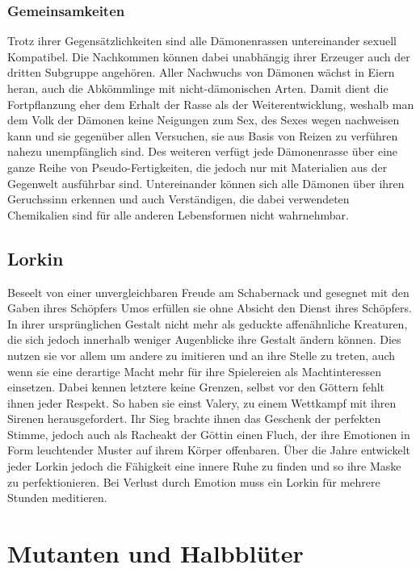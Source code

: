 \documentclass[a4paper,12pt,oneside]{book}
\begin{document}
\begin{description}
\subsection{Gemeinsamkeiten}
Trotz ihrer Gegensätzlichkeiten sind alle Dämonenrassen untereinander sexuell Kompatibel. Die Nachkommen können dabei unabhängig ihrer Erzeuger auch der dritten Subgruppe angehören. Aller Nachwuchs von Dämonen wächst in Eiern heran, auch die Abkömmlinge mit nicht-dämonischen Arten. Damit dient die Fortpflanzung eher dem Erhalt der Rasse als der Weiterentwicklung, weshalb man dem Volk der Dämonen keine Neigungen zum Sex, des Sexes wegen nachweisen kann und sie gegenüber allen Versuchen, sie aus Basis von Reizen zu verführen nahezu unempfänglich sind. Des weiteren verfügt jede Dämonenrasse über eine ganze Reihe von Pseudo-Fertigkeiten, die jedoch nur mit Materialien aus der Gegenwelt ausführbar sind. Untereinander können sich alle Dämonen über ihren Geruchssinn erkennen und auch Verständigen, die dabei verwendeten Chemikalien sind für alle anderen Lebensformen nicht wahrnehmbar. 
 \end{description}  

\section{Lorkin}
Beseelt von einer unvergleichbaren Freude am Schabernack und gesegnet mit den Gaben ihres Schöpfers Umos erfüllen sie ohne Absicht den Dienst ihres Schöpfers. In ihrer ursprünglichen Gestalt nicht mehr als geduckte affenähnliche Kreaturen, die sich jedoch innerhalb weniger Augenblicke ihre Gestalt ändern können. Dies nutzen sie vor allem um andere zu imitieren und an ihre Stelle zu treten, auch wenn sie eine derartige Macht mehr für ihre Spielereien als Machtinteressen einsetzen. Dabei kennen letztere keine Grenzen, selbst vor den Göttern fehlt ihnen jeder Respekt. So haben sie einst Valery, zu einem Wettkampf mit ihren Sirenen herausgefordert. Ihr Sieg brachte ihnen das Geschenk der perfekten Stimme, jedoch auch als Racheakt der Göttin einen Fluch, der ihre Emotionen in Form leuchtender Muster auf ihrem Körper offenbaren. Über die Jahre entwickelt jeder Lorkin jedoch die Fähigkeit eine innere Ruhe zu finden und so ihre Maske zu perfektionieren. Bei Verlust durch Emotion muss ein Lorkin für mehrere Stunden meditieren.

\chapter{Mutanten und Halbblüter}
\end{document}
